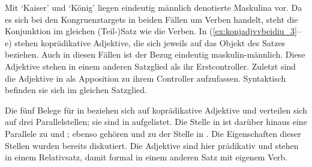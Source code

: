 Mit  `Kaiser'  und 
`König'  liegen eindeutig männlich
denotierte Maskulina vor. Da es sich bei den Kongruenztargets in beiden Fällen
um Verben handelt, steht die Konjunktion im gleichen (Teil-)Satz wie die
Verben. In (\ref{ex:konjadjvvbeidiu_3}--e) stehen
koprädikative Adjektive, die sich jeweils auf das Objekt des Satzes beziehen.
Auch in diesen Fällen ist der Bezug eindeutig maskulin-männlich. Diese
Adjektive stehen in einem anderen Satzglied als ihr Erstcontroller. Zuletzt
sind die Adjektive in  als Apposition zu ihrem
Controller aufzufassen. Syntaktisch befinden sie sich im gleichen Satzglied.

Die fünf Belege für  in  beziehen sich auf
koprädikative Adjektive und verteilen sich auf drei Parallelstellen; sie sind
in  aufgelistet. Die Stelle in
 ist darüber hinaus eine Parallele zu
 und ; ebenso gehören
 und  zu der Stelle in
. Die Eigenschaften dieser Stellen wurden bereits
diskutiert. Die Adjektive sind hier prädikativ und stehen in einem Relativsatz,
damit formal in einem anderen Satz mit eigenem Verb.

